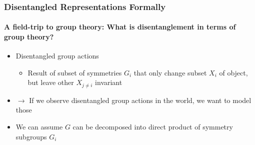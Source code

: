 \documentclass[9pt]{beamer}
\begin{document}
\begin{frame}
\frametitle{Disentangled Representations Formally}
\framesubtitle{A field-trip to group theory: What is disentanglement in terms of group theory?}
\begin{itemize}%
	\item Disentangled group actions
	\begin{itemize}
		\item Result of subset of symmetries $G_i$ that only change subset $X_i$ of object, but leave other $X_{j \neq i}$ invariant
	\end{itemize}
	\item $\rightarrow$ If we observe disentangled group actions in the world, we want to model those
	\item We can assume $G$ can be decomposed into direct product of symmetry subgroups $G_i$
\end{itemize}
\end{frame} 
\end{document}
